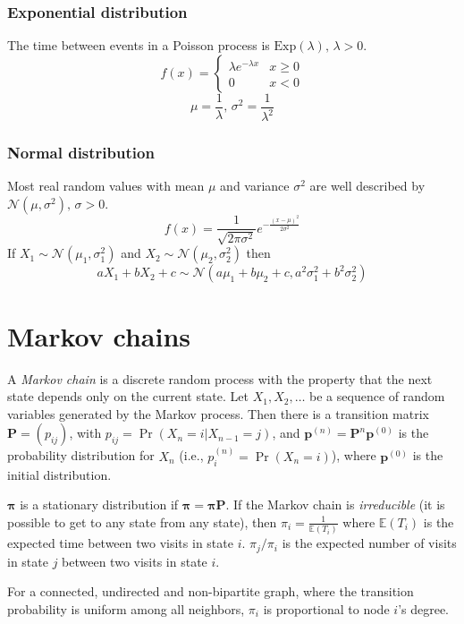 \subsubsection{Exponential distribution}
The time between events in a Poisson process is $\textrm{Exp}(\lambda),\,\lambda>0$.
\[f(x) = \left\{
\begin{array}{cl}
\lambda e^{-\lambda x} & x\geq0\\
0 & x<0
\end{array}\right.\]
\[\mu=\frac{1}{\lambda},\,\sigma^2=\frac{1}{\lambda^2}\]

\subsubsection{Normal distribution}
Most real random values with mean $\mu$ and variance $\sigma^2$ are well described by $\mathcal{N}(\mu,\sigma^2),\,\sigma>0$.
\[ f(x) = \frac{1}{\sqrt{2\pi\sigma^2}}e^{-\frac{(x-\mu)^2}{2\sigma^2}} \]
If $X_1 \sim \mathcal{N}(\mu_1,\sigma_1^2)$ and $X_2 \sim \mathcal{N}(\mu_2,\sigma_2^2)$ then
\[ aX_1 + bX_2 + c \sim \mathcal{N}(a\mu_1+b\mu_2+c,a^2\sigma_1^2+b^2\sigma_2^2) \]

\section{Markov chains}
A \emph{Markov chain} is a discrete random process with the property that the next state depends only on the current state.
Let $X_1,X_2,\ldots$ be a sequence of random variables generated by the Markov process.
Then there is a transition matrix $\mathbf{P} = (p_{ij})$, with $p_{ij} = \Pr(X_n = i | X_{n-1} = j)$,
and $\mathbf{p}^{(n)} = \mathbf P^n \mathbf p^{(0)}$ is the probability distribution for $X_n$ (i.e., $p^{(n)}_i = \Pr(X_n = i)$),
where $\mathbf{p}^{(0)}$ is the initial distribution.

$\mathbf{\pi}$ is a stationary distribution if $\mathbf{\pi} = \mathbf{\pi P}$.
If the Markov chain is \emph{irreducible} (it is possible to get to any state from any state),
then $\pi_i = \frac{1}{\mathbb{E}(T_i)}$ where $\mathbb{E}(T_i)$  is the expected time between two visits in state $i$.
$\pi_j/\pi_i$ is the expected number of visits in state $j$ between two visits in state $i$.

For a connected, undirected and non-bipartite graph, where the transition probability is uniform among all neighbors, $\pi_i$ is proportional to node $i$'s degree.

